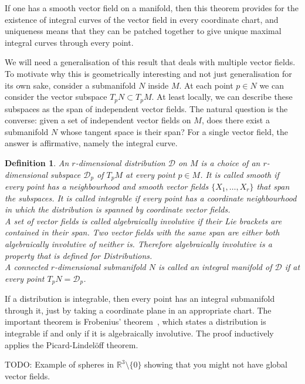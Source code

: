 \documentclass[twoside,11pt,a4paper,leqno]{article}
\numberwithin{equation}{section}
\theoremstyle{plain}
\newtheorem{definition}[equation]{Definition}
\theoremstyle{definition}
\newcommand{\bbR}{\mathbb{R}}
\begin{document}
If one has a smooth vector field on a manifold, then this theorem provides for the existence of integral curves of the vector field in every coordinate chart, and uniqueness means that they can be patched together to give unique maximal integral curves through every point.

We will need a generalisation of this result that deals with multiple vector fields.
To motivate why this is geometrically interesting and not just generalisation for its own sake, consider a submanifold $N$ inside $M$.
At each point $p \in N$ we can consider the vector subspace $T_pN \subset T_pM$.
At least locally, we can describe these subspaces as the span of independent vector fields.
The natural question is the converse: given a set of independent vector fields on $M$, does there exist a submanifold $N$ whose tangent space is their span?
For a single vector field, the answer is affirmative, namely the integral curve.

\begin{definition}
An $r$-dimensional distribution $\mathcal{D}$ on $M$ is a choice of an $r$-dimensional subspace $\mathcal{D}_p$ of $T_p M$ at every point $p \in M$.
It is called smooth if every point has a neighbourhood and smooth vector fields $\{X_1, \dots, X_r \}$ that span the subspaces. 
It is called integrable if every point has a coordinate neighbourhood in which the distribution is spanned by coordinate vector fields.
\\
A set of vector fields is called algebraically involutive if their Lie brackets are contained in their span.
Two vector fields with the same span are either both algebraically involutive of neither is.
Therefore algebraically involutive is a property that is defined for Distributions.\\
A connected $r$-dimensional submanifold $N$ is called an integral manifold of $\mathcal{D}$ if at every point $T_pN = \mathcal{D}_p$.
\\\textup{\cite[2.2.1,.2.2.2,2.3.2]{Sharpe1997}}
\end{definition}

If a distribution is integrable, then every point has an integral submanifold through it, just by taking a coordinate plane in an appropriate chart.
The important theorem is Frobenius' theorem~\cite[2.4.1]{Sharpe1997}, which states a distribution is integrable if and only if it is algebraically involutive.
The proof inductively applies the Picard-Lindelöff theorem.

TODO: Example of spheres in $\bbR^3\setminus\{0\}$ showing that you might not have global vector fields.
\end{document}
